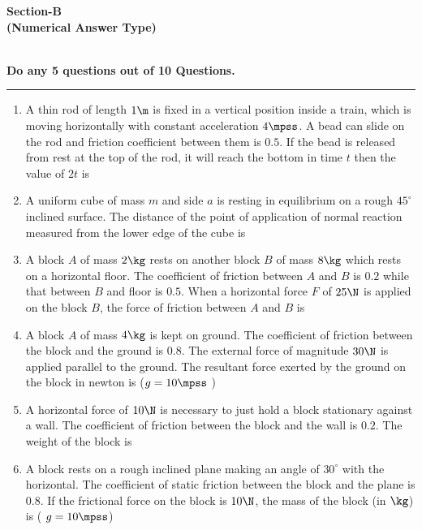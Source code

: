 \documentclass{article}
\def\ansit#1{\textcolor{red!95}{\quad [ #1 ]}}
\begin{document}
\begin{center}
\textbf{Section-B\\(Numerical Answer Type)}

{}\\

\textbf{Do any 5 questions out of 10 Questions.}

\rule{\textwidth}{1 pt}
\end{center}


\begin{enumerate}
\item A thin rod of length $1 \m$ is fixed in a vertical position inside a train, which is moving horizontally with constant acceleration $4 \mpss$. A bead can slide on the rod and friction
coefficient between them is $0.5$. If the bead is released from rest at the top of the rod, it will reach the bottom in time $t$ then the value of $2t$ is
\ansit{1}

\item A uniform cube of mass $m$ and side $a$ is resting in equilibrium on a rough $45^\circ$ inclined surface. The distance of the point of application of normal reaction measured from the lower edge of the cube is \ansit{0}

\item A block $A$ of mass $2 \kg$ rests on another block $B$ of mass $8 \kg$ which rests on a horizontal floor. The coefficient of friction between $A$ and $B$ is $0.2$ while that between $B$ and floor is $0.5$. When a horizontal force $F$ of $25 \N$ is applied on the block $B$, the force of friction between $A$ and $B$ is \ansit{0}

\item A block $A$ of mass $4 \kg$ is kept on ground. The coefficient of friction between the block and the ground is $0.8$. The external force of magnitude $30 \N$ is applied parallel to the ground. The resultant force exerted by the ground on the block in newton is ($g = 10 \mpss$ ) \ansit{50}

\item A horizontal force of $10 \N$ is necessary to just
hold a block stationary against a wall. The
coefficient of friction between the block and
the wall is $0.2$. The weight of the block is \ansit{2}

\item A block rests on a rough inclined plane making an angle of $30^\circ$ with the horizontal. The coefficient of static friction between the block and the plane is $0.8$. If the frictional force on the block is $10 \N$, the mass of the block (in $\kg$) is ( $g = 10 \mpss$)\ansit{2}


\end{enumerate}
\end{document}
